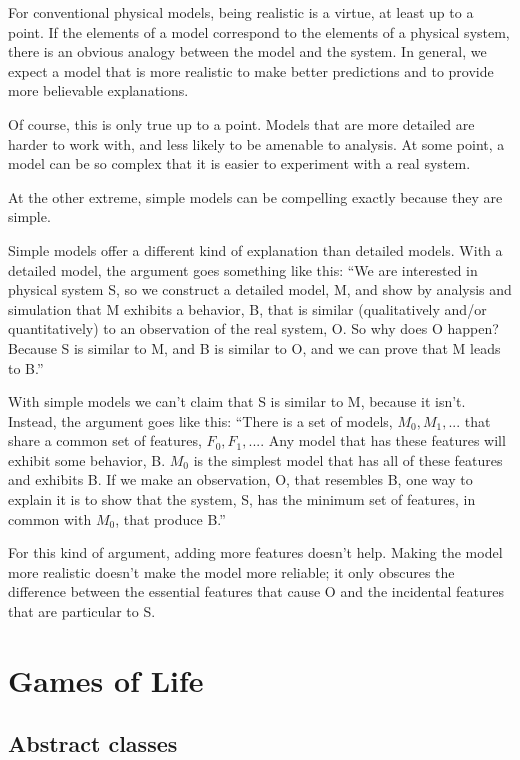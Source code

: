 \documentclass[10pt]{book}
\begin{document}
For conventional physical models, being realistic is a virtue, at
least up to a point.  If the elements of a model correspond to the
elements of a physical system, there is an obvious analogy between the
model and the system.  In general, we expect a model that is more
realistic to make better predictions and to provide more believable
explanations.

Of course, this is only true up to a point.  Models that are
more detailed are harder to work with, and less likely to be
amenable to analysis.  At some point, a model can be so complex
that it is easier to experiment with a real system.

At the other extreme, simple models can be compelling
exactly because they are simple.  

Simple models offer a different kind of explanation than detailed
models.  With a detailed model, the argument goes something
like this: ``We are interested in physical system S, so we
construct a detailed model, M, and show by analysis and simulation
that M exhibits a behavior, B, that is similar (qualitatively
and/or quantitatively) to an observation of the real system, O.
So why does O happen?  Because S is similar to M, and
B is similar to O, and we can prove that M leads to B.''

With simple models we can't claim that S is similar to M, because it
isn't.  Instead, the argument goes like this: ``There is a set of
models, ${M_0, M_1, ...}$ that share a common set of features, ${F_0,
  F_1, ...}$.  
Any model that has these features will exhibit some
behavior, B.  $M_0$ is the simplest model that has all of these
features and exhibits B.  If we make an observation, O, that
resembles B, one way to explain it is to show that the system,
S, has the minimum set of features, in common with $M_0$, that
produce B.''

For this kind of argument, 
adding more features doesn't help.  Making the model more
realistic doesn't make the model more reliable; it only
obscures the difference between the essential features that
cause O and the incidental features that are particular to
S.

\chapter{Games of Life}


\section{Abstract classes}
\end{document}
